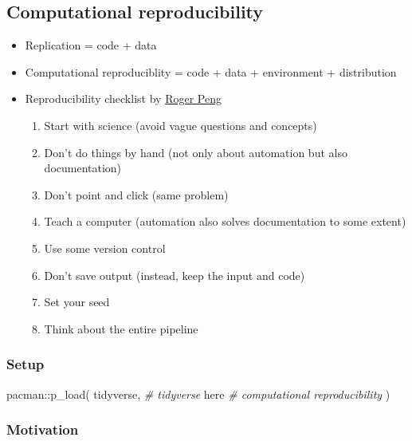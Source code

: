 \documentclass[
]{book}
\newenvironment{Shaded}{\begin{snugshade}}{\end{snugshade}}
\newcommand{\CommentTok}[1]{\textcolor[rgb]{0.56,0.35,0.01}{\textit{#1}}}
\newcommand{\FunctionTok}[1]{\textcolor[rgb]{0.00,0.00,0.00}{#1}}
\newcommand{\NormalTok}[1]{#1}
\newcommand{\SpecialCharTok}[1]{\textcolor[rgb]{0.00,0.00,0.00}{#1}}
\begin{document}
\hypertarget{computational-reproducibility}{%
\subsection{Computational reproducibility}\label{computational-reproducibility}}

\begin{itemize}
\item
  Replication = code + data
\item
  Computational reproduciblity = code + data + environment + distribution
\item
  Reproducibility checklist by \href{http://www.biostat.jhsph.edu/~rpeng/}{Roger Peng}

  \begin{enumerate}
  \def\labelenumi{\arabic{enumi}.}
  \item
    Start with science (avoid vague questions and concepts)
  \item
    Don't do things by hand (not only about automation but also documentation)
  \item
    Don't point and click (same problem)
  \item
    Teach a computer (automation also solves documentation to some extent)
  \item
    Use some version control
  \item
    Don't save output (instead, keep the input and code)
  \item
    Set your seed
  \item
    Think about the entire pipeline
  \end{enumerate}
\end{itemize}

\hypertarget{setup-1}{%
\subsubsection{Setup}\label{setup-1}}

\begin{Shaded}
\begin{Highlighting}[]
\NormalTok{pacman}\SpecialCharTok{::}\FunctionTok{p\_load}\NormalTok{(}
\NormalTok{  tidyverse, }\CommentTok{\# tidyverse}
\NormalTok{  here }\CommentTok{\# computational reproducibility}
\NormalTok{)}
\end{Highlighting}
\end{Shaded}

\hypertarget{motivation-1}{%
\subsubsection{Motivation}\label{motivation-1}}
\end{document}
